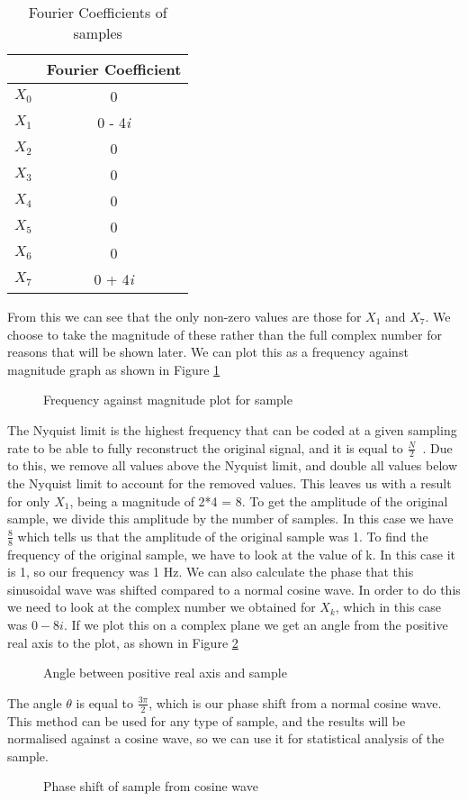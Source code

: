 \begin{table}[!htb]
\centering
\begin{tabular}{ |c|c| } 
\hline
& Fourier Coefficient \\
\hline
$X_0$ & 0 \\ 
$X_1$ & 0 - 4\textit{i} \\ 
$X_2$ & 0 \\ 
$X_3$ & 0 \\ 
$X_4$ & 0 \\ 
$X_5$ & 0 \\ 
$X_6$ & 0 \\ 
$X_7$ & 0 + 4\textit{i} \\ 
\hline
\end{tabular}
\caption{Fourier Coefficients of samples}
\label{table:fourierCoefficient}
\end{table}
From this we can see that the only non-zero values are those for $X_1$ and $X_7$. We choose to take the magnitude of these rather than the full complex number for reasons that will be shown later. We can plot this as a frequency against magnitude graph as shown in Figure \ref{fig:nyquist}
\begin{figure}[!htb]
\centering
\resizebox{10cm}{!}{}
\caption{Frequency against magnitude plot for sample}
\label{fig:nyquist}
\end{figure}
The Nyquist limit is the highest frequency that can be coded at a given sampling rate to be able to fully reconstruct the original signal, and it is equal to $\frac{N}{2}$~\cite{tretter1976introduction}. Due to this, we remove all values above the Nyquist limit, and double all values below the Nyquist limit to account for the removed values. This leaves us with a result for only $X_1$, being a magnitude of 2*4 = 8. To get the amplitude of the original sample, we divide this amplitude by the number of samples. In this case we have $\frac{8}{8}$ which tells us that the amplitude of the original sample was 1. To find the frequency of the original sample, we have to look at the value of k. In this case it is 1, so our frequency was 1 Hz. We can also calculate the phase that this sinusoidal wave was shifted compared to a normal cosine wave. In order to do this we need to look at the complex number we obtained for $X_k$, which in this case was $0-8\textit{i}$. If we plot this on a complex plane we get an angle from the positive real axis to the plot, as shown in Figure \ref{fig:complex}
\begin{figure}[!htb]
\centering
\resizebox{6cm}{!}{}
\caption{Angle between positive real axis and sample}
\label{fig:complex}
\end{figure}
The angle $\theta$ is equal to $\frac{3\pi}{2}$, which is our phase shift from a normal cosine wave. This method can be used for any type of sample, and the results will be normalised against a cosine wave, so we can use it for statistical analysis of the sample.
\begin{figure}[!htb]
\centering
\resizebox{8cm}{!}{}
\caption{Phase shift of sample from cosine wave}
\label{fig:phase}
\end{figure}
